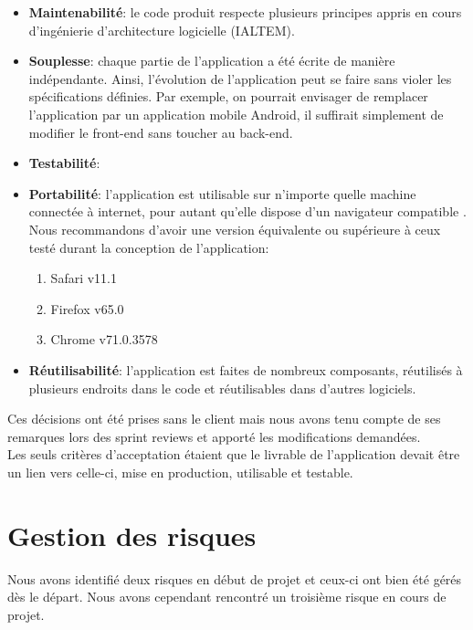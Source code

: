 \documentclass[t, 12pt, usenames,dvipsnames]{article}
\begin{document}
\begin{itemize}
            \item \textbf{Maintenabilité}: le code produit respecte plusieurs principes appris en cours d'ingénierie d'architecture logicielle (IALTEM).
            \item \textbf{Souplesse}: chaque partie de l'application a été écrite de manière indépendante. Ainsi, l'évolution de l'application peut se faire sans violer les spécifications définies. Par exemple, on pourrait envisager de remplacer l'application par un application mobile Android, il suffirait simplement de modifier le front-end sans toucher au back-end.
            \item \textbf{Testabilité}:
            \item \textbf{Portabilité}: l'application est utilisable sur n'importe quelle machine connectée à internet, pour autant qu'elle dispose d'un navigateur compatible . Nous recommandons d'avoir une version équivalente ou supérieure à ceux testé durant la conception de l'application: 
                \begin{enumerate}
                    \item Safari v11.1
                    \item Firefox v65.0
                    \item Chrome v71.0.3578
                \end{enumerate}
            \item \textbf{Réutilisabilité}: l'application est faites de nombreux composants, réutilisés à plusieurs endroits dans le code et réutilisables dans d'autres logiciels.
        \end{itemize}
        
        \noindent Ces décisions ont été prises sans le client mais nous avons tenu compte de ses remarques lors des sprint reviews et apporté les modifications demandées.\\
        Les seuls critères d'acceptation étaient que le livrable de l'application devait être un lien vers celle-ci, mise en production, utilisable et testable.
        
    

    \newpage

    \section{Gestion des risques}
    \noindent Nous avons identifié deux risques en début de projet et ceux-ci ont bien été gérés dès le départ. Nous avons cependant rencontré un troisième risque en cours de projet. 
    
\end{document}
